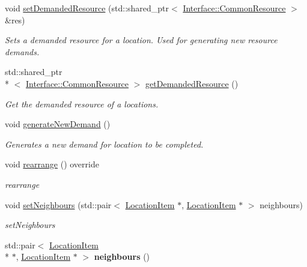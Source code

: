 \begin{DoxyCompactItemize}
void \hyperlink{class_location_item_a241a9da96a287caeb9ec2e7af88e33c1}{set\-Demanded\-Resource} (std\-::shared\-\_\-ptr$<$ \hyperlink{class_interface_1_1_common_resource}{Interface\-::\-Common\-Resource} $>$ \&res)
\begin{DoxyCompactList}\small\item\em Sets a demanded resource for a location. Used for generating new resource demands. \end{DoxyCompactList}\item 
std\-::shared\-\_\-ptr\\*
$<$ \hyperlink{class_interface_1_1_common_resource}{Interface\-::\-Common\-Resource} $>$ \hyperlink{class_location_item_a8d5355c30c32f6386094c05eddaf70ba}{get\-Demanded\-Resource} ()
\begin{DoxyCompactList}\small\item\em Get the demanded resource of a locations. \end{DoxyCompactList}\item 
void \hyperlink{class_location_item_a2700aaeb5d684ee2e4582855d5341937}{generate\-New\-Demand} ()
\begin{DoxyCompactList}\small\item\em Generates a new demand for location to be completed. \end{DoxyCompactList}\item 
\hypertarget{class_location_item_a810089a1d70ce51f4f97583ba9a551a6}{void \hyperlink{class_location_item_a810089a1d70ce51f4f97583ba9a551a6}{rearrange} () override}\label{class_location_item_a810089a1d70ce51f4f97583ba9a551a6}

\begin{DoxyCompactList}\small\item\em rearrange \end{DoxyCompactList}\item 
void \hyperlink{class_location_item_ae0057f8fa67c8cd5738fd574433254db}{set\-Neighbours} (std\-::pair$<$ \hyperlink{class_location_item}{Location\-Item} $\ast$, \hyperlink{class_location_item}{Location\-Item} $\ast$ $>$ neighbours)
\begin{DoxyCompactList}\small\item\em set\-Neighbours \end{DoxyCompactList}\item 
\hypertarget{class_location_item_abce0f5607ed14d3da2762d76fc78a996}{std\-::pair$<$ \hyperlink{class_location_item}{Location\-Item} \\*
$\ast$, \hyperlink{class_location_item}{Location\-Item} $\ast$ $>$ {\bfseries neighbours} ()}\label{class_location_item_abce0f5607ed14d3da2762d76fc78a996}


\end{DoxyCompactItemize}
